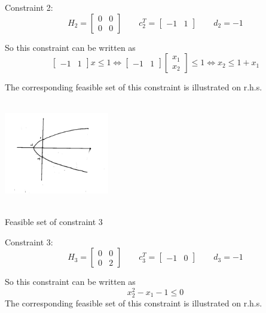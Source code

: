 \begin{example}
Constraint 2:
\begin{equation*}
H_2=
\begin{bmatrix}
0 & 0\\
0 & 0
\end{bmatrix}
\qquad
c_2^T = 
\begin{bmatrix}
-1 & 1
\end{bmatrix}
\qquad
d_2 = -1
\end{equation*}

So this constraint can be written as
\begin{equation*}
\begin{bmatrix}
-1 & 1
\end{bmatrix}x\leq 1\Leftrightarrow
\begin{bmatrix}
-1 & 1
\end{bmatrix}
\begin{bmatrix}
x_1\\
x_2
\end{bmatrix}\leq 1\Leftrightarrow x_2\leq 1 + x_1
\end{equation*}

The corresponding feasible set of this constraint is illustrated on r.h.s.

\begin{marginfigure}
	\centering
	\includegraphics[width=1.8in,height=1.8in]{figures/ch07/figure1021_4.png}
	\caption{Feasible set of constraint 3} 
\end{marginfigure}

Constraint 3:
\begin{equation*}
H_3=
\begin{bmatrix}
0 & 0\\
0 & 2
\end{bmatrix}
\qquad
c_3^T = 
\begin{bmatrix}
-1 & 0
\end{bmatrix}
\qquad
d_3 = -1 
\end{equation*}

So this constraint can be written as
$$x^2_2 - x_1 - 1\leq 0$$
The corresponding feasible set of this constraint is illustrated on r.h.s.



\end{example}
